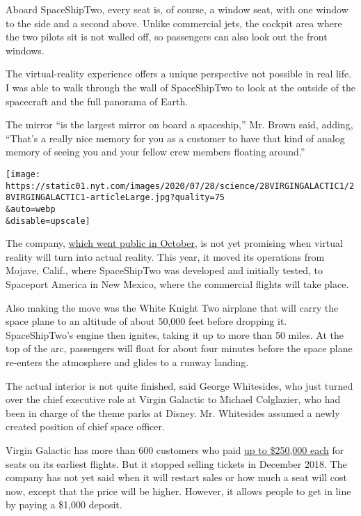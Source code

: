 Aboard SpaceShipTwo, every seat is, of course, a window seat, with one
window to the side and a second above. Unlike commercial jets, the
cockpit area where the two pilots sit is not walled off, so passengers
can also look out the front windows.

The virtual-reality experience offers a unique perspective not possible
in real life. I was able to walk through the wall of SpaceShipTwo to
look at the outside of the spacecraft and the full panorama of Earth.

The mirror ``is the largest mirror on board a spaceship,'' Mr. Brown
said, adding, ``That's a really nice memory for you as a customer to
have that kind of analog memory of seeing you and your fellow crew
members floating around.''

\texttt{[image: https://static01.nyt.com/images/2020/07/28/science/28VIRGINGALACTIC1/28VIRGINGALACTIC1-articleLarge.jpg?quality=75\\\&auto=webp\\\&disable=upscale]}

The company,
\href{https://www.nytimes.com/2019/07/09/business/richard-branson-virgin-galactic-space.html}{which
went public in October}, is not yet promising when virtual reality will
turn into actual reality. This year, it moved its operations from
Mojave, Calif., where SpaceShipTwo was developed and initially tested,
to Spaceport America in New Mexico, where the commercial flights will
take place.

Also making the move was the White Knight Two airplane that will carry
the space plane to an altitude of about 50,000 feet before dropping it.
SpaceShipTwo's engine then ignites, taking it up to more than 50 miles.
At the top of the arc, passengers will float for about four minutes
before the space plane re-enters the atmosphere and glides to a runway
landing.

The actual interior is not quite finished, said George Whitesides, who
just turned over the chief executive role at Virgin Galactic to Michael
Colglazier, who had been in charge of the theme parks at Disney. Mr.
Whitesides assumed a newly created position of chief space officer.

Virgin Galactic has more than 600 customers who paid
\href{https://www.nytimes.com/2019/10/16/science/virgin-galactic-spacesuit.html}{up
to \$250,000 each} for seats on its earliest flights. But it stopped
selling tickets in December 2018. The company has not yet said when it
will restart sales or how much a seat will cost now, except that the
price will be higher. However, it allows people to get in line by paying
a \$1,000 deposit.

